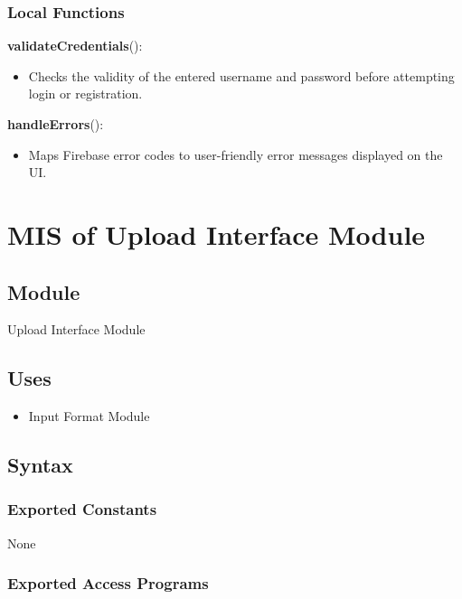\documentclass[12pt, titlepage]{article}
\begin{document}
\subsubsection{Local Functions}

\textbf{validateCredentials}():
\begin{itemize}
\item Checks the validity of the entered username and password before attempting login or registration.
\end{itemize}

\textbf{handleErrors}():
\begin{itemize}
\item Maps Firebase error codes to user-friendly error messages displayed on the UI.
\end{itemize}



\section{MIS of Upload Interface Module}\label{upload_interface_module}

\subsection{Module}

Upload Interface Module

\subsection{Uses}

\begin{itemize}
    \item Input Format Module
\end{itemize}

\subsection{Syntax}

\subsubsection{Exported Constants}

None

\subsubsection{Exported Access Programs}
\end{document}

